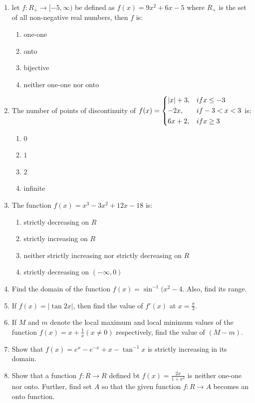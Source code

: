 \documentclass{article}
\begin{document}
\begin{enumerate}
       \item let $f:R_{+} \rightarrow [-5, \infty)$ be defined as $f(x) = 9x^{2} +6x -5$ where $R_{+}$ is the set of all non-negative real numbers, then $f$ is:
	       \begin{enumerate}
		       \item one-one
		       \item onto
		       \item bijective
		       \item neither one-one nor onto
	       \end{enumerate}
       \item The number of points of discontinuity of $f(x) = \begin{dcases}
		       |x|+3, & if x\leq-3  \\
		       -2x, & if -3<x<3 \\
		       6x+2, & if x\geq3 
       \end{dcases}$ is:
		\begin{enumerate}
			\item $0$
			\item $1$
			\item $2$
			\item infinite
		\end{enumerate}
	\item The function $f(x) = x^{3} - 3x^{2} +12x -18$ is:
		\begin{enumerate}
			\item strictly decreasing on $R$
			\item strictly increasing on $R$
			\item neither strictly increasing nor strictly decreasing on $R$
			\item strictly decreasing on $(-\infty, 0)$
		\end{enumerate}
	\item Find the domain of the function $f(x) = \sin^{-1}(x^{2} - 4$. Also, find its range.
	\item If $f(x) = |\tan 2x|$, then find the value of $f'(x)$ at $x=\frac{\pi}{3}$.
	\item If $M$ and $m$ denote the local maximum and local minimum values of the function $f(x) = x + \frac{1}{x} (x\neq0)$ respectively, find the value of $(M-m)$.
	\item Show that $f(x) = e^{x} - e^{-x} + x - \tan^{-1}x$ is strictly increasing in its domain.
	\item Show that a function $f:R \rightarrow R$ defined bt $f(x) = \frac{2x}{1+x ^{2}}$ is neither one-one nor onto. Further, find set $A$ so that the given function $f:R \rightarrow A$ becomes an onto function.

\end{enumerate}
\end{document}
